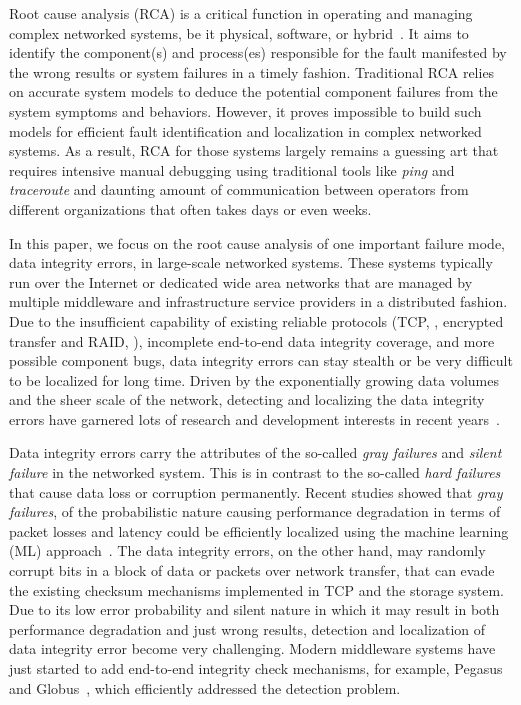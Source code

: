 Root cause analysis (RCA) is a critical function in operating and managing complex networked systems, be it physical, software, or hybrid~\cite{RCA-Review-2017}.
It aims to identify the component(s) and process(es) responsible for the fault manifested by the wrong results or system failures in a timely fashion.
Traditional RCA relies on accurate system models to deduce the potential component failures from the system symptoms and behaviors.
However,  it proves impossible to build such models for efficient fault identification and localization in complex networked systems. 
As a result, RCA for those systems largely remains a guessing art that requires intensive manual debugging using traditional tools 
like {\it ping} and {\it traceroute} and daunting amount of communication between operators from different organizations 
that often takes days or even weeks.

In this paper, we focus on the root cause analysis of one important failure mode, data integrity errors, in large-scale networked systems. These systems typically run 
over the Internet or dedicated wide area networks that are managed by multiple middleware and infrastructure service providers in a distributed fashion. 
Due to the insufficient capability of existing reliable protocols (TCP, , encrypted transfer and RAID, \et),  incomplete end-to-end data integrity coverage, and 
more possible component bugs, data integrity errors can stay stealth or be very difficult to be localized for long time.  
Driven by the exponentially growing data volumes and the sheer scale of the network, detecting and localizing the data integrity errors have garnered 
lots of research and development interests in recent years~\cite{tcp:ccr2000,swip:pearc:2019}. 

Data integrity errors carry the attributes of the so-called {\it gray failures} and {\it silent failure} in the networked system. This is in contrast to the so-called {\it hard failures} 
that cause data loss or corruption permanently. Recent studies showed that {\it gray failures}, of the probabilistic nature  causing performance degradation in terms 
of packet losses and latency could be efficiently localized using the machine learning (ML) approach~\cite{GrayFailure:2017,DeepView:NSDI18}. The data integrity errors, 
on the other hand, may randomly corrupt bits in a block of data or packets over network transfer, that can evade the existing checksum mechanisms implemented in TCP 
and the storage system. Due to its low error probability and silent nature in which it may result in both performance degradation and just wrong results, detection and localization 
of data integrity error become very challenging. Modern middleware systems have just started to add end-to-end integrity check mechanisms, 
for example, Pegasus~\cite{deelman-fgcs-2015} and Globus~\cite{IntegrityVerification:DataTransfer}, which efficiently addressed the detection problem. 

